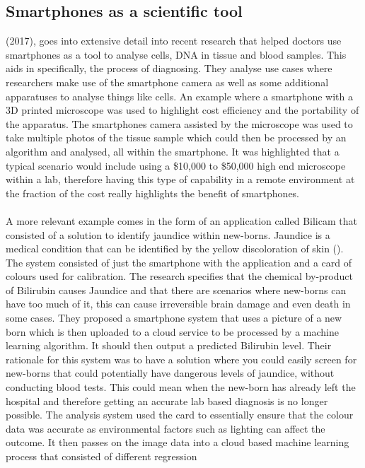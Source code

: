 \documentclass{article}
\begin{document}
\subsection{Smartphones as a scientific tool}
\citeauthor{wright2017} (2017),  goes into extensive detail into recent research that helped doctors use smartphones as a tool to analyse 
cells, DNA in tissue and blood samples. This aids in specifically, the process of diagnosing. They analyse use cases 
where researchers make use of the smartphone camera as well as some additional apparatuses to analyse things like cells.
 An example where a smartphone with a 3D printed microscope was used to highlight cost efficiency and the portability of
  the apparatus. The smartphones camera assisted by the microscope was used to take multiple photos of the tissue sample
   which could then be processed by an algorithm and analysed, all within the smartphone. It was 
   highlighted that a typical scenario would include using a \$10,000 to \$50,000 high end microscope within a lab, 
   therefore having this type of capability in a remote environment at the fraction of the cost really highlights the 
   benefit of smartphones.
\\
\\
A more relevant example comes in the form of an application called Bilicam that consisted of a solution to identify 
jaundice within new-borns. Jaundice is a medical condition that can be identified by the yellow discoloration of skin 
(\cite{deGreefLilian2014Bump}). The system consisted of just the smartphone with the application and a card of colours used for 
calibration. The research specifies that the chemical by-product of Bilirubin causes Jaundice and that there are 
scenarios where new-borns can have too much of it, this can cause irreversible brain damage and even death in some 
cases. They proposed a smartphone system that uses a picture of a new born which is then uploaded to a cloud service 
to be processed by a machine learning algorithm. It should then output a predicted Bilirubin level. Their rationale for 
this system was to have a solution where you could easily screen for new-borns that could potentially have dangerous 
levels of jaundice, without conducting blood tests. This could mean when the new-born has already left the hospital and 
therefore getting an accurate lab based diagnosis is no longer possible. The analysis system used the card to 
essentially ensure that the colour data was accurate as environmental factors such as lighting can affect the outcome. 
It then passes on the image data into a cloud based machine learning process that consisted of different regression 
\end{document}
